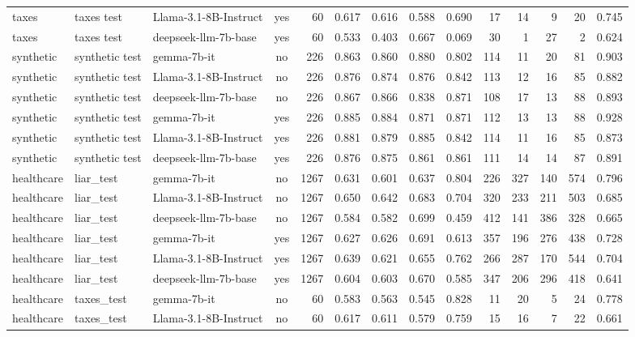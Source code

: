 \begin{landscape}
\begin{longtable}{@{}l l p{3.6cm} c r r r r r r r r r r@{}}
taxes      & taxes test      & Llama-3.1-8B-Instruct & yes &   60 & 0.617 & 0.616 & 0.588 & 0.690 &  17 &  14 &   9 &  20 & 0.745 \\
taxes      & taxes test      & deepseek-llm-7b-base  & yes &   60 & 0.533 & 0.403 & 0.667 & 0.069 &  30 &   1 &  27 &   2 & 0.624 \\
synthetic  & synthetic test  & gemma-7b-it           & no  &  226 & 0.863 & 0.860 & 0.880 & 0.802 & 114 &  11 &  20 &  81 & 0.903 \\
synthetic  & synthetic test  & Llama-3.1-8B-Instruct & no  &  226 & 0.876 & 0.874 & 0.876 & 0.842 & 113 &  12 &  16 &  85 & 0.882 \\
synthetic  & synthetic test  & deepseek-llm-7b-base  & no  &  226 & 0.867 & 0.866 & 0.838 & 0.871 & 108 &  17 &  13 &  88 & 0.893 \\
synthetic  & synthetic test  & gemma-7b-it           & yes &  226 & 0.885 & 0.884 & 0.871 & 0.871 & 112 &  13 &  13 &  88 & 0.928 \\
synthetic  & synthetic test  & Llama-3.1-8B-Instruct & yes &  226 & 0.881 & 0.879 & 0.885 & 0.842 & 114 &  11 &  16 &  85 & 0.873 \\
synthetic  & synthetic test  & deepseek-llm-7b-base  & yes &  226 & 0.876 & 0.875 & 0.861 & 0.861 & 111 &  14 &  14 &  87 & 0.891 \\
healthcare & liar\_test      & gemma-7b-it           & no  & 1267 & 0.631 & 0.601 & 0.637 & 0.804 & 226 & 327 & 140 & 574 & 0.796 \\
healthcare & liar\_test      & Llama-3.1-8B-Instruct & no  & 1267 & 0.650 & 0.642 & 0.683 & 0.704 & 320 & 233 & 211 & 503 & 0.685 \\
healthcare & liar\_test      & deepseek-llm-7b-base  & no  & 1267 & 0.584 & 0.582 & 0.699 & 0.459 & 412 & 141 & 386 & 328 & 0.665 \\
healthcare & liar\_test      & gemma-7b-it           & yes & 1267 & 0.627 & 0.626 & 0.691 & 0.613 & 357 & 196 & 276 & 438 & 0.728 \\
healthcare & liar\_test      & Llama-3.1-8B-Instruct & yes & 1267 & 0.639 & 0.621 & 0.655 & 0.762 & 266 & 287 & 170 & 544 & 0.704 \\
healthcare & liar\_test      & deepseek-llm-7b-base  & yes & 1267 & 0.604 & 0.603 & 0.670 & 0.585 & 347 & 206 & 296 & 418 & 0.641 \\
healthcare & taxes\_test     & gemma-7b-it           & no  &   60 & 0.583 & 0.563 & 0.545 & 0.828 &  11 &  20 &   5 &  24 & 0.778 \\
healthcare & taxes\_test     & Llama-3.1-8B-Instruct & no  &   60 & 0.617 & 0.611 & 0.579 & 0.759 &  15 &  16 &   7 &  22 & 0.661 \\

\end{longtable}
\end{landscape}
